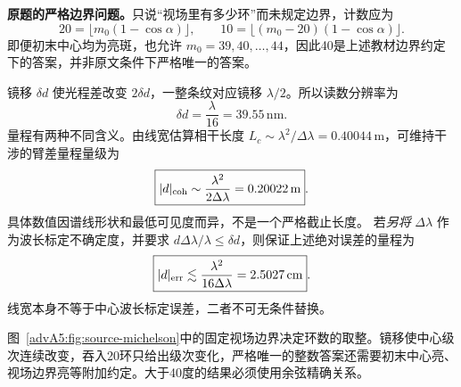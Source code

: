 \begin{advsolution}
\textbf{原题的严格边界问题。}只说“视场里有多少环”而未规定边界，计数应为
\[
 20=\lfloor m_0(1-\cos\alpha)\rfloor,\qquad
 10=\lfloor(m_0-20)(1-\cos\alpha)\rfloor.
\]
即便初末中心均为亮斑，也允许 $m_0=39,40,\ldots,44$，因此40是上述教材边界约定下的答案，并非原文条件下严格唯一的答案。

镜移 $\delta d$ 使光程差改变 $2\delta d$，一整条纹对应镜移 $\lambda/2$。所以读数分辨率为
\[
 \boxed{\delta d=\frac{\lambda}{16}=39.55\,\mathrm{nm}}.
\]
量程有两种不同含义。由线宽估算相干长度 $L_c\sim\lambda^2/\Delta\lambda=0.40044\,\mathrm m$，可维持干涉的臂差量程量级为
\[
 \boxed{|d|_{\rm coh}\sim\frac{\lambda^2}{2\Delta\lambda}=0.20022\,\mathrm m}.
\]
具体数值因谱线形状和最低可见度而异，不是一个严格截止长度。
若\emph{另将} $\Delta\lambda$ 作为波长标定不确定度，并要求 $d\Delta\lambda/\lambda\le\delta d$，则保证上述绝对误差的量程为
\[
 \boxed{|d|_{\rm err}\lesssim\frac{\lambda^2}{16\Delta\lambda}=2.5027\,\mathrm{cm}}.
\]
线宽本身不等于中心波长标定误差，二者不可无条件替换。

图~\ref{advA5:fig:source-michelson}中的固定视场边界决定环数的取整。镜移使中心级次连续改变，吞入20环只给出级次变化，严格唯一的整数答案还需要初末中心亮、视场边界亮等附加约定。大于40度的结果必须使用余弦精确关系。
\end{advsolution}

